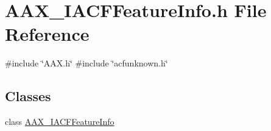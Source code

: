 \hypertarget{a00533}{}\section{A\+A\+X\+\_\+\+I\+A\+C\+F\+Feature\+Info.\+h File Reference}
\label{a00533}
{\ttfamily \#include \char`\"{}A\+A\+X.\+h\char`\"{}}\newline
{\ttfamily \#include \char`\"{}acfunknown.\+h\char`\"{}}\newline
\subsection*{Classes}
\begin{DoxyCompactItemize}
\item 
class \mbox{\hyperlink{a01689}{A\+A\+X\+\_\+\+I\+A\+C\+F\+Feature\+Info}}
\end{DoxyCompactItemize}
